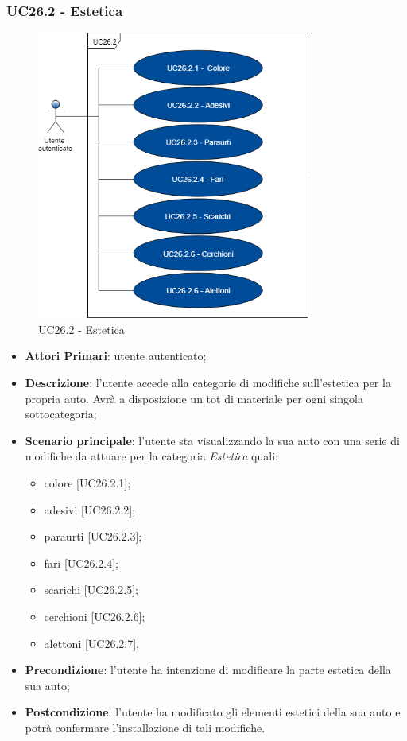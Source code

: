 \subsubsection{UC26.2 - Estetica}
\begin{figure}[h]
	\includegraphics[width=9cm]{res/images/UC26-2Estetica.png}
	\centering
	\caption{UC26.2 - Estetica}
\end{figure}
\begin{itemize}
	\item \textbf{Attori Primari}: utente autenticato;
	\item \textbf{Descrizione}: l'utente accede alla categorie di modifiche sull'estetica per la propria auto. Avrà a disposizione un tot di materiale per ogni singola sottocategoria;
	\item \textbf{Scenario principale}: l'utente sta visualizzando la sua auto con una serie di modifiche da attuare per la categoria \textit{Estetica} quali:
	\begin{itemize}
		\item colore [UC26.2.1];
		\item adesivi [UC26.2.2];
		\item paraurti [UC26.2.3];
		\item fari [UC26.2.4];
		\item scarichi [UC26.2.5];
		\item cerchioni [UC26.2.6];
		\item alettoni [UC26.2.7].
	\end{itemize}
	\item \textbf{Precondizione}: l'utente ha intenzione di modificare la parte estetica della sua auto;
	\item \textbf{Postcondizione}: l'utente ha modificato gli elementi estetici della sua auto e potrà confermare l'installazione di tali modifiche.
\end{itemize}

